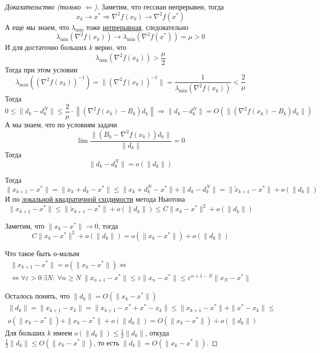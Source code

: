 \begin{proof}[Доказательство (только $\Leftarrow$)]
  Заметим, что гессиан непрерывен, тогда
  \[x_k \rightarrow x^{*} \Rightarrow \nabla^2 f(x_k) \rightarrow \nabla^2 f(x^{*})\]
  А еще мы знаем, что $\lambda_{\min}$ тоже \hyperref[note:5A4CF475-D55C-4CAA-9A68-BD8D3B60AEA9]{непрерывная}, следовательно
  \[
  \lambda_{\min}\left(\nabla^2 f(x_k)\right) \rightarrow \lambda_{\min} \left(\nabla^2 f(x^*)\right) = \mu > 0
  \]
  И для достаточно больших $k$ верно, что
  \[
  \lambda_{\min}\left(\nabla^2 f(x_k)\right)  > \frac{\mu}{2}
  \]
  Тогда при этом условии
  \[
  \lambda_{\max}\left((\nabla^2 f(x_k))^{-1}\right) = \| (\nabla^2 f(x_k))^{-1} \| =
  \frac{1}{\lambda_{\min}\left(\nabla^2 f(x_k)\right)} < \frac{2}{\mu}
  \]
  Тогда
  \[
  0 \le \| d_k - d_k^N\| \le \frac{2}{\mu} \cdot  \left\| \left( \nabla^2 f(x_k) - B_k \right) d_k\right\|
  \Rightarrow \| d_k - d_k^N\| = O\left( \|(\nabla^2 f(x_k) - B_k)d_k\| \right)
  \]
  А мы знаем, что по условиям задачи
  \[
  \lim \frac{\|(B_k - \nabla^2f(x_k))d_k\|}{\|d_k\|} = 0
  \]
  Тогда
  \[
  \| d_k - d_k^N\| = o(\|d_k\|)
  \]

  Тогда
  \[
  \|x_{k+1} - x^{*}\| = \|x_k + d_k - x^{*}\| \le \|x_k + d_k^N - x^{*}\| + \|d_k - d_k^N\| =
  \|\tilde{x}_{k+1} - x^{*}\| + o(\|d_k\|)
  \]
  И по \hyperref[note:CDA139F9-5438-41E1-96B1-11A751BE40C5]{локальной квадратичной сходимости} метода Ньютона
  \[
  \|x_{k+1} - x^{*}\| \le
  \|\tilde{x}_{k+1} - x^{*}\| + o(\|d_k\|)
  \le C\|x_k - x^{*}\|^2 + o(\|d_k\|)
  \]

  Заметим, что $\|x_k - x^{*}\| \rightarrow 0$, тогда
  \[
  C\|x_k - x^{*}\|^2 + o(\|d_k\|) = o(\|x_k - x^{*}\|)  + o(\|d_k\|)
  \]

  \begin{remark}
    Что такое быть о-малым
    \begin{multline*}
    \|x_{k+1} - x^{*}\| = o(\|x_k - x^{*}\|) \Leftrightarrow \\
    \Leftrightarrow \forall \varepsilon >0 \ \exists N:\ \forall n \ge N\ \|x_{n+1} - x^{*}\| \le \varepsilon \|x_n - x^{*}\| \le \varepsilon^{n+1-N} \|x_N - x^{*}\|
    \end{multline*}
  \end{remark}

  Осталось понять, что $\|d_k\| = O(\|x_k - x^{*}\|)$
  \begin{multline*}
  \|d_k\| = \|x_{k+1} - x_k\| = \|x_{k+1} - x^{*} + x^{*} - x_k\|
  \le \|x_{k+1} - x^{*}\|  + \|x^{*} - x_k\| \le  \\
  o(\|x_k - x^{*}\|) + \|x_k - x^{*}\| + o(\|d_k\|) =
  O(\|x_k - x^{*}\|) + o(\|d_k\|)
  \end{multline*}
  Для больших $k$ имеем $o(\|d_k\|) \le \frac{1}{2}\|d_k\|$, откуда $\frac{1}{2}\|d_k\| \le O(\|x_k - x^{*}\|)$, то есть $\|d_k\| = O(\|x_k - x^{*}\|)$.


\end{proof}
